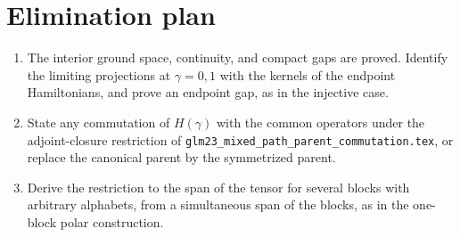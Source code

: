 \documentclass{article}
\begin{document}
\section{Elimination plan}
\begin{enumerate}
    \item The interior ground space, continuity, and compact gaps are
          proved. Identify the limiting projections at $\gamma=0,1$ with the
          kernels of the endpoint Hamiltonians, and prove an endpoint gap,
          as in the injective case.
    \item State any commutation of $H(\gamma)$ with the common operators
          under the adjoint-closure restriction of
          \texttt{glm23\_mixed\_path\_parent\_commutation.tex}, or replace
          the canonical parent by the symmetrized parent.
    \item Derive the restriction to the span of the tensor for several
          blocks with arbitrary alphabets, from a simultaneous span of the
          blocks, as in the one-block polar construction.
\end{enumerate}



\end{document}
